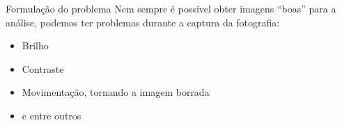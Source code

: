 \begin{frame}{Formulação do problema}
    Nem sempre é possível obter imagens ``boas'' para a análise, podemos ter problemas durante a captura da fotografia:
    \begin{itemize}
        \item Brilho
        \item Contraste
        \item Movimentação, tornando a imagem borrada
        \item e entre outros
    \end{itemize}
\end{frame}